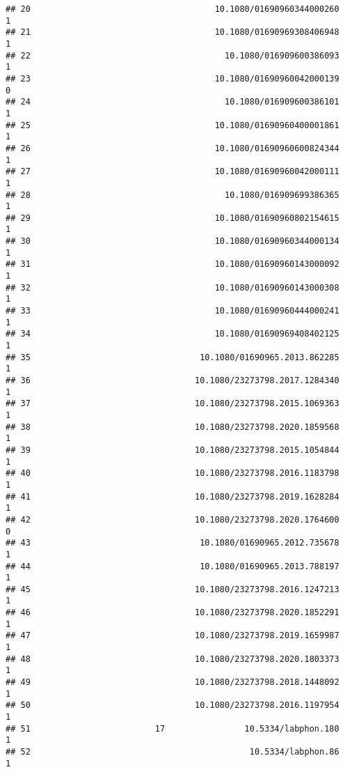 \documentclass[
  english,
  man]{apa6}
\begin{document}
\begin{verbatim}
## 20                                     10.1080/01690960344000260            1
## 21                                     10.1080/01690969308406948            1
## 22                                       10.1080/016909600386093            1
## 23                                     10.1080/01690960042000139            0
## 24                                       10.1080/016909600386101            1
## 25                                     10.1080/01690960400001861            1
## 26                                     10.1080/01690960600824344            1
## 27                                     10.1080/01690960042000111            1
## 28                                       10.1080/016909699386365            1
## 29                                     10.1080/01690960802154615            1
## 30                                     10.1080/01690960344000134            1
## 31                                     10.1080/01690960143000092            1
## 32                                     10.1080/01690960143000308            1
## 33                                     10.1080/01690960444000241            1
## 34                                     10.1080/01690969408402125            1
## 35                                  10.1080/01690965.2013.862285            1
## 36                                 10.1080/23273798.2017.1284340            1
## 37                                 10.1080/23273798.2015.1069363            1
## 38                                 10.1080/23273798.2020.1859568            1
## 39                                 10.1080/23273798.2015.1054844            1
## 40                                 10.1080/23273798.2016.1183798            1
## 41                                 10.1080/23273798.2019.1628284            1
## 42                                 10.1080/23273798.2020.1764600            0
## 43                                  10.1080/01690965.2012.735678            1
## 44                                  10.1080/01690965.2013.788197            1
## 45                                 10.1080/23273798.2016.1247213            1
## 46                                 10.1080/23273798.2020.1852291            1
## 47                                 10.1080/23273798.2019.1659987            1
## 48                                 10.1080/23273798.2020.1803373            1
## 49                                 10.1080/23273798.2018.1448092            1
## 50                                 10.1080/23273798.2016.1197954            1
## 51                         17                10.5334/labphon.180            1
## 52                                            10.5334/labphon.86            1

\end{verbatim}
\end{document}
